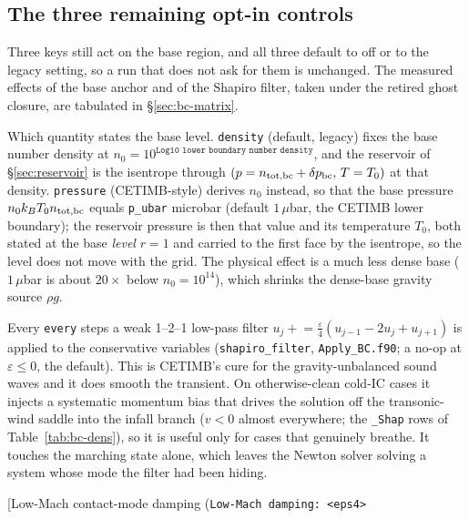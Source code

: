 \documentclass[english,a4paper]{my_memo}
\begin{document}
\subsection{The three remaining opt-in controls}
\label{sec:stabilizers}

Three keys still act on the base region, and all three default to off or to
the legacy setting, so a run that does not ask for them is unchanged. The
measured effects of the base anchor and of the Shapiro filter, taken under
the retired ghost closure, are tabulated in \S\ref{sec:bc-matrix}.

\begin{description}
\item[Base anchor (\texttt{Base BC: density | pressure [<p\_ubar>]}).] Which
  quantity states the base level. \texttt{density} (default, legacy) fixes
  the base number density at $n_0 = 10^{\texttt{Log10 lower boundary number
  density}}$, and the reservoir of \S\ref{sec:reservoir} is the isentrope
  through $(p = n_{\rm tot,bc}+\delta p_{\rm bc},\, T = T_0)$ at that
  density. \texttt{pressure} (CETIMB-style) derives $n_0$ instead, so that
  the base pressure $n_0 k_B T_0 n_{\rm tot,bc}$ equals \texttt{p\_ubar}
  microbar (default $1\,\mu$bar, the CETIMB lower boundary); the reservoir
  pressure is then that value and its temperature $T_0$, both stated at the
  base \emph{level} $r=1$ and carried to the first face by the isentrope, so
  the level does not move with the grid. The physical effect is a much less
  dense base ($1\,\mu$bar is about $20\times$ below $n_0 = 10^{14}$), which
  shrinks the dense-base gravity source $\rho g$.
\item[Shapiro filter (\texttt{Shapiro filter: <eps> [<every>]}).] Every
  \texttt{every} steps a weak 1--2--1 low-pass filter
  $u_j \mathrel{+}= \tfrac{\varepsilon}{4}(u_{j-1} - 2u_j + u_{j+1})$ is
  applied to the conservative variables (\texttt{shapiro\_filter},
  \texttt{Apply\_BC.f90}; a no-op at $\varepsilon \le 0$, the default). This
  is CETIMB's cure for the gravity-unbalanced sound waves and it does
  smooth the transient. On otherwise-clean cold-IC cases it injects a
  systematic momentum bias that drives the solution off the transonic-wind
  saddle into the infall branch ($v<0$ almost everywhere; the
  \texttt{\_Shap} rows of Table~\ref{tab:bc-dens}), so it is useful only for
  cases that genuinely breathe. It touches the marching state alone, which
  leaves the Newton solver solving a system whose mode the filter had been
  hiding.
\item[Low-Mach contact-mode damping (\texttt{Low-Mach damping: <eps4>
}
\end{description}
\end{document}
